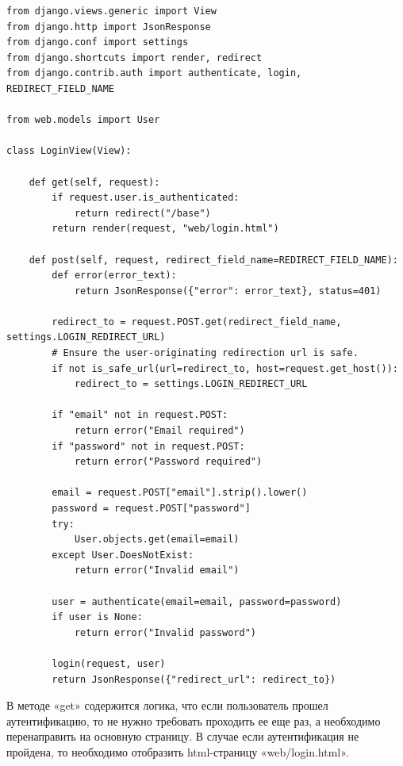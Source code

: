 \begin{lstlisting}[style=py]
from django.views.generic import View
from django.http import JsonResponse
from django.conf import settings
from django.shortcuts import render, redirect
from django.contrib.auth import authenticate, login, REDIRECT_FIELD_NAME

from web.models import User

class LoginView(View):

    def get(self, request):
        if request.user.is_authenticated:
            return redirect("/base")
        return render(request, "web/login.html")

    def post(self, request, redirect_field_name=REDIRECT_FIELD_NAME):
        def error(error_text):
            return JsonResponse({"error": error_text}, status=401)

        redirect_to = request.POST.get(redirect_field_name, settings.LOGIN_REDIRECT_URL)
        # Ensure the user-originating redirection url is safe.
        if not is_safe_url(url=redirect_to, host=request.get_host()):
            redirect_to = settings.LOGIN_REDIRECT_URL

        if "email" not in request.POST:
            return error("Email required")
        if "password" not in request.POST:
            return error("Password required")

        email = request.POST["email"].strip().lower()
        password = request.POST["password"]
        try:
            User.objects.get(email=email)
        except User.DoesNotExist:
            return error("Invalid email")

        user = authenticate(email=email, password=password)
        if user is None:
            return error("Invalid password")

        login(request, user)
        return JsonResponse({"redirect_url": redirect_to})
\end{lstlisting}
В методе «get» содержится логика, что если пользователь прошел аутентификацию, то не нужно требовать проходить ее еще раз,
а необходимо перенаправить на основную страницу. В случае если аутентификация не пройдена, то необходимо отобразить
html-страницу «web/login.html».

